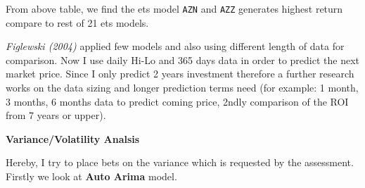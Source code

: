 \documentclass[]{tufte-book}
\newenvironment{Shaded}{}{}
\newcommand{\KeywordTok}[1]{\textcolor[rgb]{0.00,0.44,0.13}{\textbf{#1}}}
\newcommand{\DataTypeTok}[1]{\textcolor[rgb]{0.56,0.13,0.00}{#1}}
\newcommand{\StringTok}[1]{\textcolor[rgb]{0.25,0.44,0.63}{#1}}
\newcommand{\ControlFlowTok}[1]{\textcolor[rgb]{0.00,0.44,0.13}{\textbf{#1}}}
\newcommand{\OperatorTok}[1]{\textcolor[rgb]{0.40,0.40,0.40}{#1}}
\newcommand{\NormalTok}[1]{#1}
\begin{document}
From above table, we find the ets model \texttt{AZN} and \texttt{AZZ}
generates highest return compare to rest of 21 ets models.

\emph{Figlewski (2004)} applied few models and also using different
length of data for comparison. Now I use daily Hi-Lo and 365 days data
in order to predict the next market price. Since I only predict 2 years
investment therefore a further research works on the data sizing and
longer prediction terms need (for example: 1 month, 3 months, 6 months
data to predict coming price, 2ndly comparison of the ROI from 7 years
or upper).

\textbf{Variance/Volatility Analsis}

Hereby, I try to place bets on the variance which is requested by the
assessment. Firstly we look at \textbf{Auto Arima} model.

\begin{Shaded}
\end{Shaded}
\end{document}
